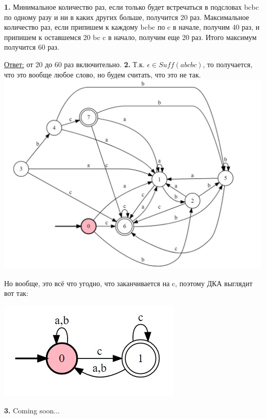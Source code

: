 \documentclass[a4paper,14pt]{article} %
\begin{document}
\textbf{1.} Минимальное количество раз, если только будет встречаться в подсловах bcbc по одному разу и ни в каких других больше, получится 20 раз.
Максимальное количество раз, если припишем к каждому bcbc по c в начале, получим 40 раз, и припишем к оставшемся 20 bc c в начало, получим еще 20 раз. Итого максимум получится 60 раз.

\underline{Ответ:} от 20 до 60 раз включительно.
\newline
\textbf{2.} Т.к. $\epsilon \in Suff(abcbc)$, то получается, что это вообще любое слово, но будем считать, что это не так.
\newline
\includegraphics[scale=0.95]{06.jpg}

Но вообще, это всё что угодно, что заканчивается на c, поэтому ДКА выглядит вот так:

\includegraphics{07.jpg}

\textbf{3.} Coming soon...
\end{document}
